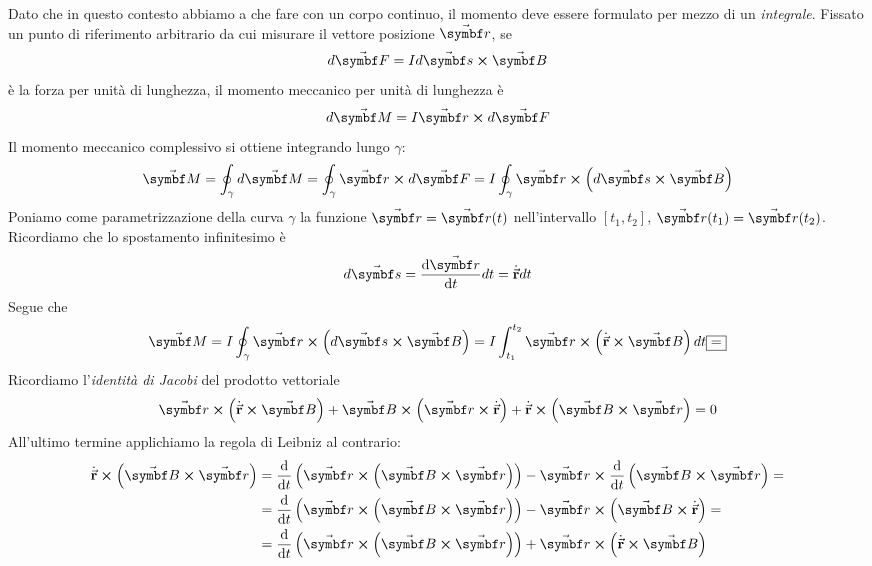\begin{demonstration}
	Dato che in questo contesto abbiamo a che fare con un corpo continuo, il momento deve essere formulato per mezzo di un \textit{integrale}. Fissato un punto di riferimento arbitrario da cui misurare il vettore posizione $\vba{r}$, se
	\begin{equation*}
		d\vba{F}=Id\vba{s}\cross \vba{B}
	\end{equation*}
	è la forza per unità di lunghezza, il momento meccanico per unità di lunghezza è
	\begin{equation*}
		d\vba{M}=I\vba{r}\cross d\vba{F}
	\end{equation*}
	Il momento meccanico complessivo si ottiene integrando lungo $\gamma$:
	\begin{equation*}
		\vba{M}=\oint_\gamma d\vba{M}=\oint_\gamma \vba{r}\cross d\vba{F}=I \oint_\gamma \vba{r}\cross\left(d\vba{s}\cross\vba{B}\right)
	\end{equation*}
		Poniamo come parametrizzazione della curva $\gamma$ la funzione $\vba{r}=\vba{r}(t)$ nell'intervallo $\left[t_1, t_2\right]$, $\vba{r}(t_1)=\vba{r}(t_2)$. Ricordiamo che lo spostamento infinitesimo è
	\begin{equation*}
		d\vba{s}=\dv{\vba{r}}{t}dt=\vbd{r}dt
	\end{equation*}
	Segue che
	\begin{equation*}
		\vba{M}=I\oint_\gamma \vba{r}\cross\left(d\vba{s}\cross\vba{B}\right)=I\int_{t_1}^{t_2}\vba{r}\cross\left(\vbd{r}\cross\vba{B}\right)dt\squarequal
	\end{equation*}
	Ricordiamo l'\textit{identità di Jacobi} del prodotto vettoriale
	\begin{equation*}
		\vba{r}\cross\left(\vbd{r}\cross\vba{B}\right)+\vba{B}\cross\left(\vba{r}\cross\vbd{r}\right)+\vbd{r}\cross\left(\vba{B}\cross\vba{r}\right)=0
	\end{equation*}
	All'ultimo termine applichiamo la regola di Leibniz al contrario:
	\begin{align*}
		\vbd{r}\cross\left(\vba{B}\cross\vba{r}\right)&=\dv{t}\left(\vba{r}\cross\left(\vba{B}\cross\vba{r}\right)\right)-\vba{r}\cross\dv{t}\left(\vba{B}\cross\vba{r}\right)=\\
		&=\dv{t}\left(\vba{r}\cross\left(\vba{B}\cross\vba{r}\right)\right)-\vba{r}\cross\left(\vba{B}\cross \vbd{r}\right)=\\
		&=\dv{t}\left(\vba{r}\cross\left(\vba{B}\cross\vba{r}\right)\right)+\vba{r}\cross\left(\vbd{r}\cross\vba{B}\right)
	\end{align*}

\end{demonstration}
